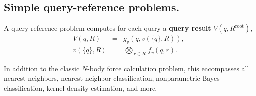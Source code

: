 \documentclass[twoside,leqno,twocolumn]{article}
\newcommand{\bigvec}[1]{\mathop{\overrightarrow{#1}}}
\newcommand{\summary}{\delta}
\newcommand{\mysub}[1]{\subsection{#1.}}
\newcommand{\defterm}[1]{{\bf #1}}
\newcommand{\kdroot}[1]{#1^{\text{root}}}
\newcommand{\lo}[1]{#1^{l}}
\newcommand{\up}[1]{#1^{u}}
\newcommand{\distlo}{\lo{d}}
\newcommand{\distup}{\up{d}}
\newcommand{\nameOp}[2]{\mathop{#1\nolimits\!\!_{#2}}}
\newcommand{\nameop}[2]{#1_{\!#2}}
\newcommand{\myOp}[1]{\nameOp{\bigotimes}{#1}}
\newcommand{\myop}[1]{\nameop{\otimes}{#1}}
\newcommand{\letterglob}{\psi}
\newcommand{\canpruneglob}{C_{\letterglob}}
\newcommand{\deltaglob}{\summary_{\letterglob}}
\newcommand{\letterqr}{v}
\newcommand{\outqr}{V}
\newcommand{\Opqr}{\myOp{\letterqr}}
\newcommand{\fqr}{f_{\letterqr}}
\newcommand{\gqr}{g_{\letterqr}}
\newcommand{\inqrv}{v}
\newcommand{\letterstat}{s}
\newcommand{\outstat}{\sigma}
\newcommand{\opstat}{\myop{\letterstat}}
\newcommand{\fstat}{f_{\letterstat}}
\begin{document}
%


\mysub{Simple query-reference problems}
A query-reference problem computes for each query a \defterm{query result} $\outqr(q, \kdroot{R})$,
\begin{eqnarray}
\outqr(q, R) &=& \gqr(q, \inqrv(\{q\}, R)),
\\
\inqrv(\{q\}, R) &=& \Opqr_{r \in R} \fqr(q, r).
\label{eqn:qrdef}
\end{eqnarray}

\noindent
In addition to the classic $N$-body force calculation problem, this encompasses all nearest-neighbors, nearest-neighbor classification, nonparametric Bayes classification, kernel density estimation, and more.
\end{document}
